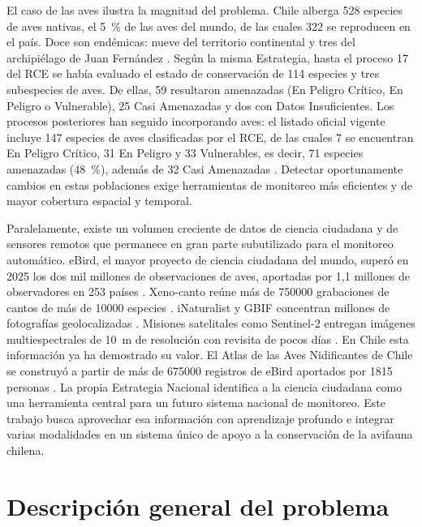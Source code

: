 El caso de las aves ilustra la magnitud del problema. Chile alberga 528
especies de aves nativas, el \SI{5}{\percent} de las aves del mundo, de las
cuales 322 se reproducen en el país. Doce son endémicas: nueve del territorio continental
y tres del archipiélago de Juan Fernández \citep{barros2015lista,
mma2022enca}. Según la misma Estrategia, hasta el proceso 17 del RCE se había
evaluado el estado de conservación de 114 especies y tres subespecies de aves.
De ellas, 59 resultaron amenazadas (En Peligro Crítico, En Peligro o
Vulnerable), 25 Casi Amenazadas y dos con Datos Insuficientes. Los procesos
posteriores han seguido incorporando aves: el listado oficial vigente
incluye 147 especies de aves clasificadas por el RCE, de las cuales 7 se
encuentran En Peligro Crítico, 31 En Peligro y 33 Vulnerables, es decir, 71
especies amenazadas (\SI{48}{\percent}), además de 32 Casi Amenazadas
\citep{mma2026rce}. Detectar oportunamente cambios en estas poblaciones exige
herramientas de monitoreo más eficientes y de mayor cobertura espacial y
temporal.

Paralelamente, existe un volumen creciente de datos de ciencia ciudadana y de
sensores remotos que permanece en gran parte subutilizado para el monitoreo
automático. eBird, el mayor proyecto de ciencia ciudadana del mundo, superó
en 2025 los dos mil millones de observaciones de aves, aportadas por 1,1
millones de observadores en 253 países \citep{sullivan2014ebird,
ebird2025billion}. Xeno-canto reúne más de \num{750000} grabaciones de cantos
de más de \num{10000} especies \citep{vellinga2015xenocanto, hamer2023birb}.
iNaturalist y GBIF concentran millones de fotografías geolocalizadas
\citep{vanhorn2018inaturalist}. Misiones satelitales como Sentinel-2
entregan imágenes multiespectrales de \SI{10}{\metre} de resolución con
revisita de pocos días \citep{drusch2012sentinel2}. En Chile esta
información ya ha demostrado su valor. El Atlas de las Aves Nidificantes de
Chile se construyó a partir de más de \num{675000} registros de eBird
aportados por \num{1815} personas \citep{medrano2018atlas}. La propia
Estrategia Nacional identifica a la ciencia ciudadana como una herramienta
central para un futuro sistema nacional de monitoreo. Este trabajo busca
aprovechar esa información con aprendizaje profundo e integrar varias
modalidades en un sistema único de apoyo a la conservación de la avifauna
chilena.

\section{Descripción general del problema}\label{sec:problema}

